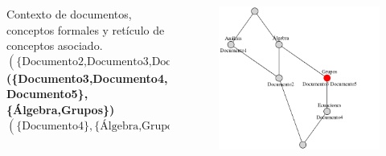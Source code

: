 \documentclass{beamer}
\begin{document}
{\begin{columns}
\begin{column}{0.5\textwidth}
\begin{table}[H]
{    }
    \end{table}
    \vspace{-2mm}
    \centering
    Contexto de documentos, conceptos formales y retículo de conceptos asociado.
    \tiny{
    $$(\{\text{Documento2,Documento3,Documento5,Documento4}\},\{\text{Álgebra}\})$$
    {\color{Maroon} \textbf{(\{Documento3,Documento4,Documento5\},\{Álgebra,Grupos\})}}
    $$(\{\text{Documento4}\},\{\text{Álgebra,Grupos,Ecuaciones}\})$$
    }
    \end{column}
    \begin{column}{0.5\textwidth}
    \begin{center}
    \hspace{3mm}
            \begin{figure}[H]
            \includegraphics[scale=0.3]{images/documentos.png}
            \end{figure}
        \end{center}
    \end{column}
    \end{columns}

       
}
    
\end{document}
